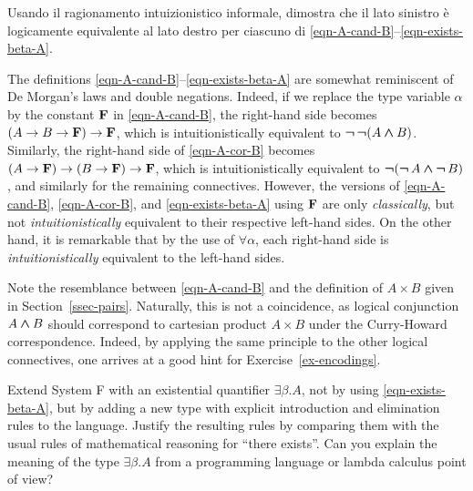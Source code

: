 \documentclass{article}
\begin{document}
\begin{exercise}
	Usando il ragionamento intuizionistico informale, dimostra che il lato sinistro
	\`e logicamente equivalente al lato destro per ciascuno di
	{\eqref{eqn-A-cand-B}}--{\eqref{eqn-exists-beta-A}}.
\end{exercise}

\begin{remark}
  The definitions {\eqref{eqn-A-cand-B}}--{\eqref{eqn-exists-beta-A}}
  are somewhat reminiscent of De Morgan's laws and double negations.
  Indeed, if we replace the type variable $\alpha$ by the constant
  ${\bf F}$ in {\eqref{eqn-A-cand-B}}, the right-hand side becomes
  $(A\to B\to{\bf F})\to{\bf F}$, which is intuitionistically
  equivalent to $\mathop{\textrm{\rm\boldmath $\neg$}}\mathop{\textrm{\rm\boldmath $\neg$}}(A\mathbin{\textrm{\rm\boldmath $\wedge$}} B)$. Similarly, the right-hand side
  of {\eqref{eqn-A-cor-B}} becomes
  $(A\to{\bf F})\to(B\to{\bf F})\to{\bf F}$, which is
  intuitionistically equivalent to $\mathop{\textrm{\rm\boldmath $\neg$}}(\mathop{\textrm{\rm\boldmath $\neg$}} A\mathbin{\textrm{\rm\boldmath $\wedge$}}\mathop{\textrm{\rm\boldmath $\neg$}} B)$, and
  similarly for the remaining connectives. However, the versions of
  {\eqref{eqn-A-cand-B}}, {\eqref{eqn-A-cor-B}}, and
  {\eqref{eqn-exists-beta-A}} using ${\bf F}$ are only {\em
    classically}, but not {\em intuitionistically} equivalent to
  their respective left-hand sides. On the other hand, it is
  remarkable that by the use of $\forall\alpha$, each right-hand
  side is {\em intuitionistically} equivalent to the left-hand sides.
\end{remark}

\begin{remark}
  Note the resemblance between {\eqref{eqn-A-cand-B}} and the
  definition of $A\times B$ given in Section~\ref{ssec-pairs}.
  Naturally, this is not a coincidence, as logical conjunction $A\mathbin{\textrm{\rm\boldmath $\wedge$}}
  B$ should correspond to cartesian product $A\times B$ under the
  Curry-Howard correspondence. Indeed, by applying the same principle
  to the other logical connectives, one arrives at a good hint for
  Exercise~\ref{ex-encodings}.
\end{remark}

\begin{exercise}
  Extend System F with an existential quantifier $\exists\beta.A$, not
  by using {\eqref{eqn-exists-beta-A}}, but by adding a new type with
  explicit introduction and elimination rules to the language. Justify
  the resulting rules by comparing them with the usual rules of
  mathematical reasoning for ``there exists''. Can you explain the
  meaning of the type $\exists\beta.A$ from a programming language or
  lambda calculus point of view?
\end{exercise}
\end{document}
